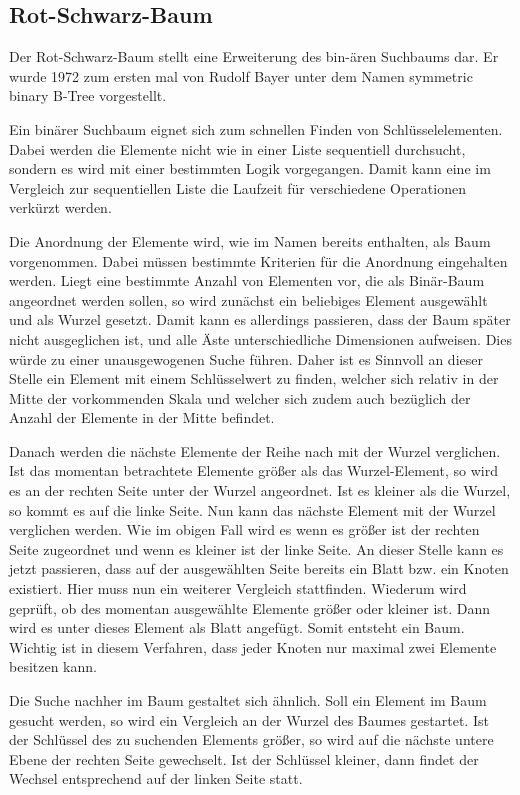 \subsection{Rot-Schwarz-Baum}
Der Rot-Schwarz-Baum stellt eine Erweiterung des bin-ären Suchbaums dar. Er wurde 1972 zum ersten mal von Rudolf Bayer unter dem Namen \glqq symmetric binary B-Tree\grqq{} vorgestellt.

Ein binärer Suchbaum eignet sich zum schnellen Finden von Schlüsselelementen. Dabei werden die Elemente nicht wie in einer Liste sequentiell durchsucht, sondern es wird mit einer bestimmten Logik vorgegangen.
Damit kann eine im Vergleich zur sequentiellen Liste die Laufzeit für verschiedene Operationen verkürzt werden.

Die Anordnung der Elemente wird, wie im Namen bereits enthalten, als Baum vorgenommen. Dabei müssen bestimmte Kriterien für die Anordnung eingehalten werden. Liegt eine bestimmte Anzahl von Elementen vor, die als Binär-Baum angeordnet werden sollen, so wird zunächst ein beliebiges Element ausgewählt und als Wurzel gesetzt. Damit kann es allerdings passieren, dass der Baum später nicht ausgeglichen ist, und alle Äste unterschiedliche Dimensionen aufweisen. Dies würde zu einer unausgewogenen Suche führen. Daher ist es Sinnvoll an dieser Stelle ein Element mit einem Schlüsselwert zu finden, welcher sich relativ in der Mitte der vorkommenden Skala und welcher sich zudem auch bezüglich der Anzahl der Elemente in der Mitte befindet.

Danach werden die nächste Elemente der Reihe nach mit der Wurzel verglichen. Ist das momentan betrachtete Elemente größer als das Wurzel-Element, so wird es an der rechten Seite unter der Wurzel angeordnet. Ist es kleiner als die Wurzel, so kommt es auf die linke Seite. Nun kann das nächste Element mit der Wurzel verglichen werden. Wie im obigen Fall wird es wenn es größer ist der rechten Seite zugeordnet und wenn es kleiner ist der linke Seite. An dieser Stelle kann es jetzt passieren, dass auf der ausgewählten Seite bereits ein Blatt bzw. ein Knoten existiert. Hier muss nun ein weiterer Vergleich stattfinden. Wiederum wird geprüft, ob des momentan ausgewählte Elemente größer oder kleiner ist. Dann wird es unter dieses Element als Blatt angefügt. Somit entsteht ein Baum. Wichtig ist in diesem Verfahren, dass jeder Knoten nur maximal zwei Elemente besitzen kann. 

Die Suche nachher im Baum gestaltet sich ähnlich. Soll ein Element im Baum gesucht werden, so wird ein Vergleich an der Wurzel des Baumes gestartet. Ist der Schlüs\-sel des zu suchenden Elements größer, so wird auf die nächste untere Ebene der rechten Seite gewechselt. Ist der Schlüssel kleiner, dann findet der Wechsel entsprechend auf der linken Seite statt. 

